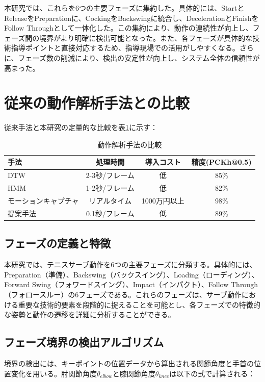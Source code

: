 \documentclass[oneside]{suribt}[11pt]
\begin{document}
本研究では、これらを6つの主要フェーズに集約した。具体的には、StartとReleaseをPreparationに、CockingをBackswingに統合し、DecelerationとFinishをFollow Throughとして一体化した。この集約により、動作の連続性が向上し、フェーズ間の境界がより明確に検出可能となった。また、各フェーズが具体的な技術指導ポイントと直接対応するため、指導現場での活用がしやすくなる。さらに、フェーズ数の削減により、検出の安定性が向上し、システム全体の信頼性が高まった。

\section{従来の動作解析手法との比較}
従来手法と本研究の定量的な比較を表\ref{tab:method_comparison}に示す：

\begin{table}[htbp]
\caption{動作解析手法の比較}
\label{tab:method_comparison}
\centering
\begin{tabular}{lccc}
\hline
手法 & 処理時間 & 導入コスト & 精度(PCKh@0.5) \\
\hline
DTW & 2-3秒/フレーム & 低 & 85\% \\
HMM & 1-2秒/フレーム & 低 & 82\% \\
モーションキャプチャ & リアルタイム & 1000万円以上 & 98\% \\
提案手法 & 0.1秒/フレーム & 低 & 89\% \\
\hline
\end{tabular}
\end{table}

\subsection{フェーズの定義と特徴}
本研究では、テニスサーブ動作を6つの主要フェーズに分類する。具体的には、Preparation（準備）、Backswing（バックスイング）、Loading（ローディング）、Forward Swing（フォワードスイング）、Impact（インパクト）、Follow Through（フォロースルー）の6フェーズである。これらのフェーズは、サーブ動作における重要な技術的要素を段階的に捉えることを可能とし、各フェーズでの特徴的な姿勢と動作の遷移を詳細に分析することができる。


\subsection{フェーズ境界の検出アルゴリズム}
境界の検出には、キーポイントの位置データから算出される関節角度と手首の位置変化を用いる。肘関節角度$\theta_{elbow}$と膝関節角度$\theta_{knee}$は以下の式で計算される：
\end{document}

